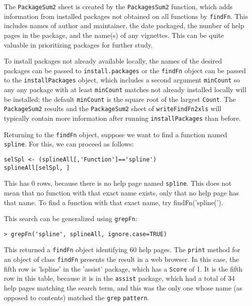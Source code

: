 The {\tt PackageSum2} sheet is created by the 
{\tt PackagesSum2} function, which adds information from 
installed packages not obtained on all functions by 
{\tt findFn}.  This includes names of author and maintainer, 
the date packaged, the number of help pages in the package, 
and the name(s) of any vignettes.  This can be quite 
valuable in prioritizing packages for further study.  

To install packages not already available locally, 
the names of the desired packages can be passed to 
{\tt install.packages} or the {\tt findFn} object can be 
passed to the {\tt installPackages} object, which includes
a second argument {\tt minCount} so any any package with 
at least {\tt minCount} matches not already installed 
locally will be installed;  the default {\tt minCount} 
is the square root of the largest {\tt Count}.  The 
{\tt PackageSum2} results and the {\tt PackageSum2} 
sheet of {\tt writeFindFn2xls} will typically contain 
more information after running {\tt installPackages} 
than before.  

Returning to the {\tt findFn} object, suppose we want 
to find a function named {\tt spline}.  For this, we can 
proceed as follows:
\begin{verbatim}
selSpl <- (splineAll[,'Function']=='spline')
splineAll[selSpl, ]
\end{verbatim}
This has 0 rows, because there is no help page named 
{\tt spline}.  This does not mean that no function 
with that exact name exists, only that no help page 
has that name.  To find a function with that exact
name, try {findFn('spline(')}.  

This search can be generalized using {\tt grepFn}:
\begin{verbatim}
> grepFn('spline', splineAll, ignore.case=TRUE)
\end{verbatim}
This returned a {\tt findFn} object identifying 60 help pages.
The {\tt print} method for an object of class {\tt findFn}
presents the result in a web browser.  In this case, 
the fifth row is 'lspline' in the 
'assist' package, which has a {\tt Score} of 1.  It 
is the fifth row in this table, because it is in the 
{\tt assist} package, which had a total of 34 help 
pages matching the search term, and this was the only 
one whose name (as opposed to contents) matched the 
{\tt grep} {\tt pattern}.  









